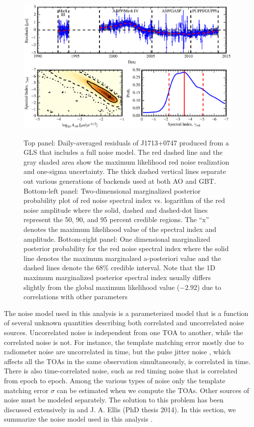 %
\begin{figure}[!ht]
\centering
\includegraphics[scale=1.0]{fig3.eps} \\ 
\caption{\label{fig:res} Top panel: Daily-averaged residuals of J1713+0747 produced from a GLS that includes a 
full noise model. The red dashed line and the gray shaded area show the maximum likelihood red noise
realization and one-sigma uncertainty. The thick dashed vertical lines separate out various generations
of backends used at both AO and GBT.
Bottom-left panel: Two-dimensional marginalized posterior probability plot of red
noise spectral index vs. logarithm of the red noise amplitude where the solid, dashed and
dashed-dot lines represent the 50, 90, and 95 percent credible regions. The ``x'' denotes
the maximum likelihood value of the spectral index and amplitude.
Bottom-right panel: One dimensional marginalized posterior probability for the
red noise spectral index where the solid line denotes the maximum marginalzed a-posteriori
value and the dashed lines denote the 68\% credible interval. Note that the
1D maximum marginalized posterior spectral index usually differs slightly from the
global maximum likelihood value ($-2.92$) due to correlations with other parameters}
\end{figure} 
%
The noise model used in this analysis is a parameterized model that is a function of several unknown quantities describing both correlated and uncorrelated noise sources. Uncorrelated noise is 
independent from one TOA to another, while the correlated noise is not. 
For instance, the template matching error mostly due to radiometer noise are
uncorrelated in time, but the pulse jitter noise \citep{cs10}, which affects all the TOAs 
in the same observation simultaneously, is correlated in time.
There is also time-correlated noise, such as red timing noise that is
correlated from epoch to epoch. Among the various types of noise only the
template matching error $\sigma$ can be estimated when we compute the TOAs.
Other sources of noise must be modeled separately. The solution to this problem has been discussed extensively in \citet{vl13, ell13, vv14a, vv14, abb+14} and J. A. Ellis (PhD thesis 2014). In this section, we summarize the noise model used in this analysis \citep[see e.g.][for more details]{abb+15b}.



